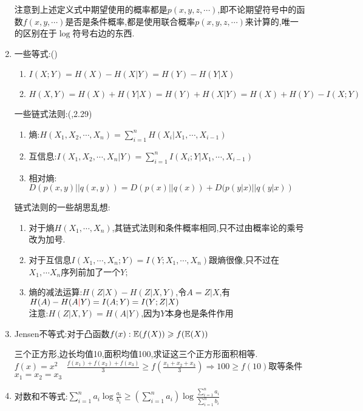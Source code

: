 \documentclass{article}
\begin{document}
\begin{enumerate}[label=(\arabic*)]
\begin{remark}
					注意到上述定义式中期望使用的概率都是$p(x,y,z,\cdots)$,即不论期望符号中的函数$f(x,y,\cdots )$是否是条件概率,都是使用联合概率$p(x,y,z,\cdots)$来计算的,唯一的区别在于$\log $符号右边的东西.
				\end{remark}
	\item 一些等式:\quad ({})
				\begin{enumerate}[label=(\alph*)]
					\item $I(X;Y) = H(X)-H(X|Y) = H(Y)-H(Y|X)$
					\item $H(X,Y) = H(X)+H(Y|X) = H(Y)+H(X|Y) = H(X)+H(Y)-I(X;Y)$
				\end{enumerate}
				一些链式法则:\quad ({,2.29})
				\begin{enumerate}[label=(\alph*)]
					\item 熵:$H(X_1,X_2,\cdots ,X_n) = \sum_{i=1}^{n}H(X_i|X_1,\cdots ,X_{i-1})$
					\item 互信息:$I(X_1,X_2,\cdots ,X_n|Y) = \sum_{i=1}^{n}I(X_i;Y|X_1,\cdots ,X_{i-1})$
					\item 相对熵:$D(p(x,y)||q(x,y)) = D(p(x)||q(x))+D(p(y|x)||q(y|x))$
				\end{enumerate}
				\begin{remark}
					链式法则的一些胡思乱想:
					\begin{enumerate}[label=(\alph*)]
						\item 对于熵$H(X_1,\cdots ,X_n)$,其链式法则和条件概率相同,只不过由概率论的乘号改为加号.
						\item 对于互信息$I(X_1,\cdots ,X_n;Y) = I(Y;X_1,\cdots ,X_n)$跟熵很像,只不过在$X_1,\cdots X_n$序列前加了一个$Y;$
						\item 熵的减法运算:$H(Z|X)-H(Z|X,Y)$,令$A=Z|X$,有\\
									$H(A)-H(A{\color{red} |}Y) = I(A;Y) = I(Y;Z|X)$\\
									{\red 注意:}$H(Z|X,Y) = H(A|Y)$,因为$Y$本身也是条件作用
					\end{enumerate}
				\end{remark}
	\item Jensen不等式:对于凸函数$f(x):\mathbb{E}(f(X))\geqslant f(\mathbb{E}(X))$
				\begin{example}
					三个正方形,边长均值10,面积均值100,求证这三个正方形面积相等.
					$f(x)=x^2\quad \frac{f(x_1)+f(x_2)+f(x_3)}{3}\geq f\left(\frac{x_1+x_2+x_3}{3}\right)\Rightarrow 100\geq f(10)$取等条件$x_1=x_2=x_3$
				\end{example}
	\item 对数和不等式:$\sum_{i=1}^{n}a_i \log \frac{a_i}{b_i}\geq \left(\sum_{i=1}^{n}a_i\right)\log \frac{\sum_{i=1}^{n}a_i}{\sum_{i=1}^{n}b_i}$

\end{enumerate}
\end{document}
